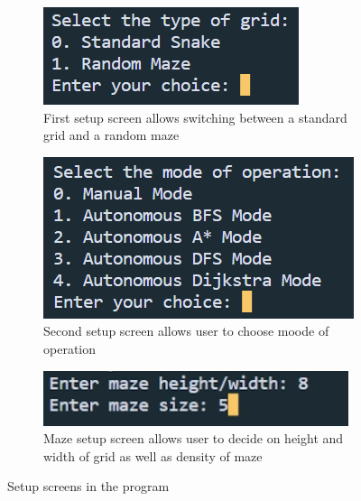 \documentclass[11pt]{article}
\begin{document}
\begin{figure}[H]

\begin{subfigure}{0.3\textwidth}
    \includegraphics{Setup_1} 
    \caption{First setup screen allows switching between a standard grid and a random maze}
    \label{fig:subim1}
\end{subfigure}
\begin{subfigure}{0.3\textwidth}
    \includegraphics[scale=0.82]{Setup_2}
    \caption{Second setup screen allows user to choose moode of operation}
    \label{fig:subim2}
\end{subfigure}
\begin{subfigure}{0.3\textwidth}
    \includegraphics[scale=0.8]{Maze_Generation}
    \caption{Maze setup screen allows user to decide on height and width of grid as well as density of maze}
    \label{fig:subim3}
\end{subfigure}

\caption{Setup screens in the program}
\label{fig:image1}
\end{figure}
\end{document}
